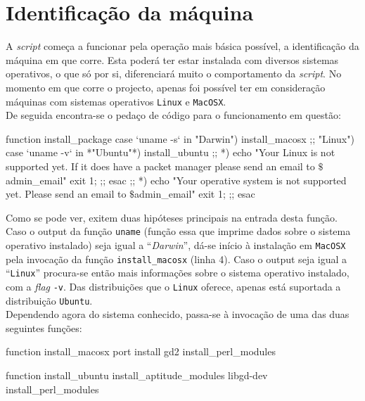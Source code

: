 \section{Identificação da máquina}\label{sec idmaq}

A \emph{script} começa a funcionar pela operação mais básica possível, a identificação da máquina em que corre. Esta poderá ter estar instalada com diversos sistemas operativos, o que 
só por si, diferenciará muito o comportamento da \emph{script}. No momento em que corre o projecto, apenas foi possível ter em consideração máquinas com sistemas operativos \texttt{Linux}
 e \texttt{MacOSX}.\\

De seguida encontra-se o pedaço de código para o funcionamento em questão:\\

\begin{myxml}
function install_package {
        case `uname -s` in
                "Darwin")
                        install_macosx
                        ;;
                "Linux")
	case `uname -v` in
		*"Ubuntu"*)
		install_ubuntu
		;;
		*)
		echo "Your Linux is not supported yet. If it does have a packet manager please send an email to $\$$admin_email"
		exit 1;
		;;
		esac
		;;
                *)
		echo "Your operative system is not supported yet. Please send an email to $\$$admin_email"
		exit 1;
		;;
        esac
}
\end{myxml}

Como se pode ver, exitem duas hipóteses principais na entrada desta função. Caso o output da função \texttt{uname} (função essa que imprime dados sobre o sistema operativo
 instalado) seja igual a ``\emph{Darwin}'', dá-se início à instalação em \texttt{MacOSX} pela invocação da função \texttt{install\_macosx} (linha 4). Caso o output seja igual a 
``\texttt{Linux}'' procura-se então mais informações sobre o sistema operativo instalado, com a \emph{flag} \texttt{-v}. Das distribuições que o \texttt{Linux} oferece, apenas está 
suportada a distribuição \texttt{Ubuntu}.\\

Dependendo agora do sistema conhecido, passa-se à invocação de uma das duas seguintes funções:\\

\begin{myxml}
 function install_macosx {
        port install gd2
        install_perl_modules 
}   
    
function install_ubuntu {
        install_aptitude_modules libgd-dev
        install_perl_modules
}
\end{myxml}

